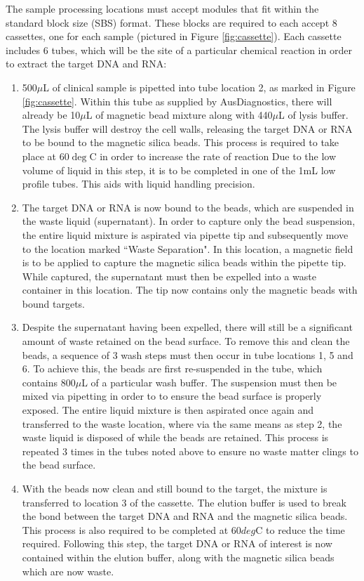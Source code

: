 The sample processing locations must accept modules that fit within the standard block size (SBS) format. These blocks are required to each accept 8 cassettes, one for each sample (pictured in Figure \ref{fig:cassette}). Each cassette includes 6 tubes, which will be the site of a particular chemical reaction in order to extract the target DNA and RNA:
\begin{enumerate}
	\item 500$\mu$L of clinical sample is pipetted into tube location 2, as marked in Figure \ref{fig:cassette}. Within this tube as supplied by AusDiagnostics, there will already be 10$\mu$L of magnetic bead mixture along with 440$\mu$L of lysis buffer. The lysis buffer will destroy the cell walls, releasing the target DNA or RNA to be bound to the magnetic silica beads. This process is required to take place at 60$\deg$C in order to increase the rate of reaction Due to the low volume of liquid in this step, it is to be completed in one of the 1mL low profile tubes. This aids with liquid handling precision.
	\item The target DNA or RNA is now bound to the beads, which are suspended in the waste liquid (supernatant). In order to capture only the bead suspension, the entire liquid mixture is aspirated via pipette tip and subsequently move to the location marked ``Waste Separation". In this location, a magnetic field is to be applied to capture the magnetic silica beads within the pipette tip. While captured, the supernatant must then be expelled into a waste container in this location. The tip now contains only the magnetic beads with bound targets.
	\item Despite the supernatant having been expelled, there will still be a significant amount of waste retained on the bead surface. To remove this and clean the beads, a sequence of 3 wash steps must then occur in tube locations 1, 5 and 6. To achieve this, the beads are first re-suspended in the tube, which contains 800$\mu$L of a particular wash buffer. The suspension must then be mixed via pipetting in order to to ensure the bead surface is properly exposed. The entire liquid mixture is then aspirated once again and transferred to the waste location, where via the same means as step 2, the waste liquid is disposed of while the beads are retained. This process is repeated 3 times in the tubes noted above to ensure no waste matter clings to the bead surface.
	\item With the beads now clean and still bound to the target, the mixture is transferred to location 3 of the cassette. The elution buffer is used to break the bond between the target DNA and RNA and the magnetic silica beads. This process is also required to be completed at 60$deg$C to reduce the time required. Following this step, the target DNA or RNA of interest is now contained within the elution buffer, along with the magnetic silica beads which are now waste.

\end{enumerate}
